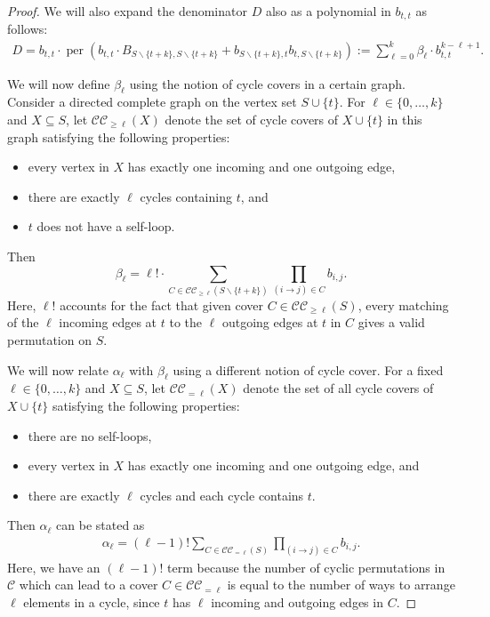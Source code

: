 \documentclass[10pt,a4paper]{amsart}
\DeclareMathOperator{\per}{per}
\begin{document}
\begin{proof}
We will also expand the denominator $D$ also as a polynomial in $b_{t,t}$ as follows:
 \begin{align*}
        D = b_{t,t} \cdot \per\left(b_{t,t} \cdot B_{S\backslash \{t+k\}, S \backslash \{t+k\}} +b_{S\backslash \{t+k\}, t} b_{t, S\backslash \{t+k\}} \right) := \sum_{\ell = 0}^k \beta_\ell \cdot b_{t,t}^{k-\ell +1}.
    \end{align*}

    We will now define $\beta_{\ell}$ using the notion of cycle covers in a certain graph. 
    Consider a directed complete graph on the vertex set $S \cup \{t\}$. For $\ell \in \{0, \ldots, k\}$ and $X \subseteq S$, let $\mathcal{CC}_{\geq \ell}(X)$ denote the set of cycle covers of $X \cup \{t\}$ in this graph satisfying the following properties:
    \begin{itemize}
        \item every vertex in $X$  has exactly one incoming and one outgoing edge,
        \item there are exactly $\ell$ cycles containing $t$, and
        \item $t$ does not have a self-loop.
    \end{itemize}
    
    Then
    \begin{equation*}
        \beta_\ell = \ell! \cdot \sum_{C \in \mathcal{CC}_{\geq \ell}(S \backslash \{t+k\})} \prod_{(i\rightarrow j) \in C} b_{i,j}.
    \end{equation*}
    Here, $\ell!$ accounts for the fact that given cover $C \in \mathcal{CC}_{\geq \ell}(S)$, every matching of the $\ell$ incoming edges at $t$ to the $\ell$ outgoing edges at $t$ in $C$ gives a valid permutation on $S$.
    
    We will now relate $\alpha_\ell$ with $\beta_\ell$ using a different notion of cycle cover. For a fixed $\ell \in \{0, \ldots, k\}$ and $X \subseteq S$, let $\mathcal{CC}_{=\ell}(X)$ denote the set of all cycle covers of $X \cup \{t\} $ satisfying the following properties:
    \begin{itemize}
        \item there are no self-loops,
        \item every vertex in $X$ has exactly one incoming and one outgoing edge, and
        \item there are exactly $\ell$ cycles and each cycle contains $t$.
    \end{itemize}
    
    
  Then $ \alpha_{\ell}$ can be stated as
    \begin{align}
        \alpha_{\ell} = (\ell-1)!\sum_{C\in \mathcal{CC}_{=\ell}(S)} \prod_{(i\rightarrow j) \in C} b_{i,j} . \label{eq:alpha}
    \end{align}
    Here, we have an $(\ell-1)!$ term because the number of cyclic permutations in $\mathcal{C}$ which can lead to a cover $C \in \mathcal{CC}_{=\ell}$ is equal to the number of ways to arrange $\ell$ elements in a cycle, since $t$ has $\ell$ incoming and outgoing edges in $C$.


\end{proof}
\end{document}
